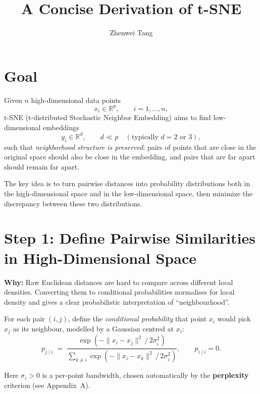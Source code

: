 \documentclass[11pt]{article}
\begin{document}
\title{A Concise Derivation of t-SNE}
\author{Zhenwei Tang}
\date{}
\maketitle

\section*{Goal}

Given $n$ high-dimensional data points
\[
  x_i \in \mathbb{R}^p, \qquad i = 1, \dots, n,
\]
t-SNE (t-distributed Stochastic Neighbor Embedding) aims to find low-dimensional
embeddings
\[
  y_i \in \mathbb{R}^d, \qquad d \ll p \quad (\text{typically } d = 2 \text{ or } 3),
\]
such that \emph{neighborhood structure is preserved}: pairs of points that are
close in the original space should also be close in the embedding, and pairs that
are far apart should remain far apart.

The key idea is to turn pairwise distances into probability distributions both in
the high-dimensional space and in the low-dimensional space, then minimize the
discrepancy between these two distributions.

\section*{Step 1: Define Pairwise Similarities in High-Dimensional Space}

\textbf{Why:} Raw Euclidean distances are hard to compare across different local
densities. Converting them to conditional probabilities normalises for local
density and gives a clear probabilistic interpretation of ``neighbourhood''.

For each pair $(i, j)$, define the \emph{conditional probability} that point
$x_i$ would pick $x_j$ as its neighbour, modelled by a Gaussian centred at
$x_i$:
\[
  p_{j \mid i}
  \;=\;
  \frac{\exp\!\left(-\|x_i - x_j\|^2 \,/\, 2\sigma_i^2\right)}
       {\displaystyle\sum_{k \neq i} \exp\!\left(-\|x_i - x_k\|^2 \,/\, 2\sigma_i^2\right)},
  \qquad p_{i \mid i} = 0.
\]

Here $\sigma_i > 0$ is a per-point bandwidth, chosen automatically by the
\textbf{perplexity} criterion (see Appendix~A).
\end{document}
